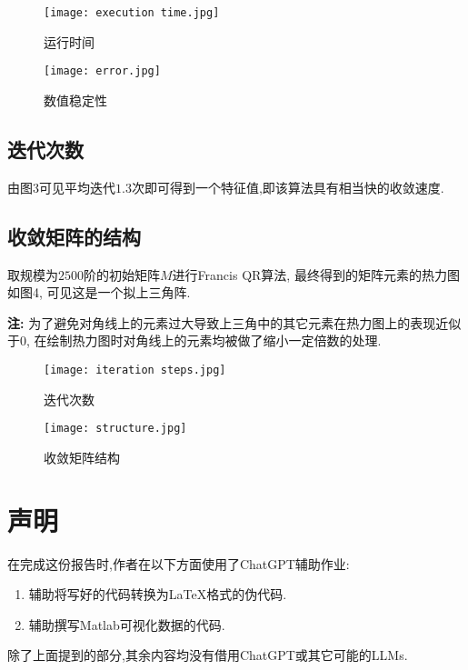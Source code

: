 \documentclass[12pt, a4paper, oneside]{ctexart}
\begin{document}
    \begin{figure}[htbp]
        \centering
        \begin{minipage}{0.45\textwidth}
            \centering
            \texttt{[image: execution time.jpg]}
            \caption{运行时间}
        \end{minipage} 
        \hfill
        \begin{minipage}{0.45\textwidth}
            \centering
            \texttt{[image: error.jpg]}
            \caption{数值稳定性}
        \end{minipage}
    \end{figure}

\subsection{迭代次数}
    由图3可见平均迭代$1.3$次即可得到一个特征值,即该算法具有相当快的收敛速度.

\subsection{收敛矩阵的结构}
    取规模为$2500$阶的初始矩阵$M$进行Francis QR算法, 最终得到的矩阵元素的热力图如图4, 可见这是一个拟上三角阵.\par
    \textbf{注:} 为了避免对角线上的元素过大导致上三角中的其它元素在热力图上的表现近似于$0$, 在绘制热力图时对角线上的元素均被做了缩小一定倍数的处理.

    \begin{figure}[htbp]
        \centering
        \begin{minipage}{0.45\textwidth}
            \centering
            \texttt{[image: iteration steps.jpg]}
            \caption{迭代次数}
        \end{minipage} 
        \hfill
        \begin{minipage}{0.45\textwidth}
            \centering
            \texttt{[image: structure.jpg]}
            \caption{收敛矩阵结构}
        \end{minipage}
    \end{figure}
\newpage
\section{声明}
    在完成这份报告时,作者在以下方面使用了ChatGPT辅助作业:
    \begin{enumerate}
        \item 辅助将写好的代码转换为LaTeX格式的伪代码.
        \item 辅助撰写Matlab可视化数据的代码.
    \end{enumerate}
    除了上面提到的部分,其余内容均没有借用ChatGPT或其它可能的LLMs.
\end{document}
